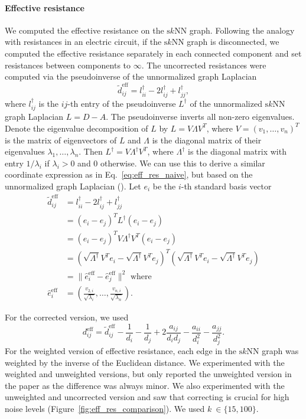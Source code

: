 \documentclass{article}
\newcommand{\sknn}{\ensuremath{\text{s}k\text{NN}}}
\theoremstyle{plain}
\theoremstyle{definition}
\theoremstyle{remark}
\begin{document}
\paragraph{Effective resistance}
We computed the effective resistance on the \sknn{} graph. Following the analogy with resistances in an electric circuit, if the \sknn{} graph is disconnected, we computed the effective resistance separately in each connected component and set resistances between components to $\infty$. The uncorrected resistances were computed via the pseudoinverse of the unnormalized graph Laplacian~\citep{fouss2007random}
\begin{equation}
    \tilde{d}^\text{eff}_{ij} = l_{ii}^\dag - 2l_{ij}^\dag + l_{jj}^\dag,
\end{equation}
where $l_{ij}^\dag$ is the $ij$-th entry of the pseudoinverse $L^\dag$ of the unnormalized \sknn{} graph Laplacian $L = D -A$. The pseudoinverse inverts all non-zero eigenvalues. Denote the eigenvalue decomposition of $L$ by $L = V \Lambda V^T$, where $V=(v_1, \dots, v_n)^T$ is the matrix of eigenvectors of $L$ and $\Lambda$ is the diagonal matrix of their eigenvalues $\lambda_1, \dots, \lambda_n$. Then $L^\dag = V \Lambda^\dag V^T$, where $\Lambda^\dag$ is the diagonal matrix with entry $1/\lambda_i$ if $\lambda_i>0$ and $0$ otherwise. We can use this to derive a similar coordinate expression as in Eq.~\ref{eq:eff_res_naive}, but based on the unnormalized graph Laplacian (\citep[4.B]{fouss2007random}). Let $e_i$ be the $i$-th standard basis vector
\begin{align}
    \tilde{d}^\text{eff}_{ij} &= l_{ii}^\dag - 2l_{ij}^\dag + l_{jj}^\dag\nonumber\\
    &=(e_i - e_j)^T L^\dag (e_i- e_j) \nonumber \\
    &= (e_i - e_j)^T V \Lambda^\dag V^T (e_i- e_j) \nonumber \\
     &= \left(\sqrt{\Lambda^\dag} V^T e_i - \sqrt{\Lambda^\dag} V^Te_j\right)^T \left(\sqrt{\Lambda^\dag} V^T e_i - \sqrt{\Lambda^\dag} V^Te_j\right)\nonumber \\
    &= \| \hat{e}_i^{\text{eff}} - \hat{e}_j^{\text{eff}}\|^2 \text{ where}\nonumber \\
    \hat{e}_i^{\text{eff}}&= \left(\frac{v_{2,i}}{\sqrt{\lambda_i}}, \dots, \frac{v_{n,i}}{\sqrt{\lambda_n}}\right).
\end{align}

For the corrected version, we used
\begin{equation}
    d^\text{eff}_{ij} = \tilde{d}^\text{eff}_{ij} - \frac{1}{d_i} - \frac{1}{d_j} + 2 \frac{a_{ij}}{d_id_j} - \frac{a_{ii}}{d_i^2} - \frac{a_{jj}}{d_j^2}.
\end{equation}
For the weighted version of effective resistance, each edge in the \sknn{} graph was weighted by the inverse of the Euclidean distance. We experimented with the weighted and unweighted versions, but only reported the unweighted version in the paper as the difference was always minor. We also experimented with the unweighted and uncorrected version and saw that correcting is crucial for high noise levels (Figure~\ref{fig:eff_res_comparison}). We used $k~\in\{15, 100\}$. 
\end{document}
